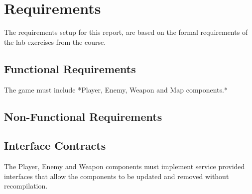 \section{Requirements}
The requirements setup for this report, are based on the formal requirements of
the lab exercises from the course. 

\subsection{Functional Requirements}
The game must include *Player, Enemy, Weapon and Map components.*

\subsection{Non-Functional Requirements}


\subsection{Interface Contracts}
The Player, Enemy and Weapon components must implement service provided 
interfaces that allow the components to be updated and removed without 
recompilation.